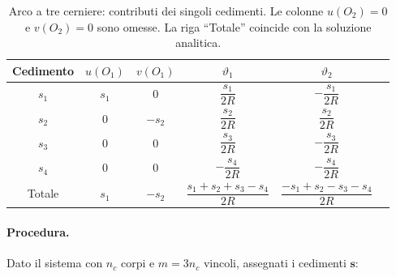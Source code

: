 	
	
	\begin{table}[H]
		\small 
		\centering
		\renewcommand{\arraystretch}{1.8}
		\begin{tabular}{cccccc}
			\toprule
			Cedimento & $u(O_1)$ & $v(O_1)$ &
			$\vartheta_1$ & $\vartheta_2$ \\
			\midrule
			$s_1$ & $s_1$ & $0$ &
			$\dfrac{s_1}{2R}$ & $-\dfrac{s_1}{2R}$ \\[6pt]
			$s_2$ & $0$ & $-s_2$ &
			$\dfrac{s_2}{2R}$ & $\dfrac{s_2}{2R}$ \\[6pt]
			$s_3$ & $0$ & $0$ &
			$\dfrac{s_3}{2R}$ & $-\dfrac{s_3}{2R}$ \\[6pt]
			$s_4$ & $0$ & $0$ &
			$-\dfrac{s_4}{2R}$ & $-\dfrac{s_4}{2R}$ \\[6pt]
			\midrule
			Totale & $s_1$ & $-s_2$ &
			$\dfrac{s_1+s_2+s_3-s_4}{2R}$ &
			$\dfrac{-s_1+s_2-s_3-s_4}{2R}$ \\
			\bottomrule
		\end{tabular}
		\caption{Arco a tre cerniere: contributi dei singoli
			cedimenti. Le colonne $u(O_2)=0$ e $v(O_2)=0$
			sono omesse. La riga ``Totale'' coincide con la
			soluzione analitica.}
		\label{tab:arco_cedimenti}
	\end{table}
	












\newpage
\paragraph{Procedura.}
Dato il sistema con $n_c$ corpi e $m = 3n_c$ vincoli,
assegnati i cedimenti $\bm{s}$:

